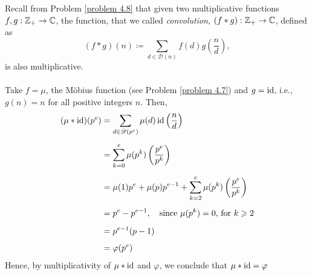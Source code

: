 \vspace*{1em}

Recall from Problem \ref{problem 4.8} that given two multiplicative functions $f,g:\mathbb Z_+ \to \mathbb C$, the function, that we called \emph{convolution}, $(f*g):\mathbb Z_+ \to \mathbb C$, defined as
\[(f*g)(n) \coloneqq \sum_{d \in \mathscr{D}(n)}f(d)g\left(\frac{n}{d}\right),\]
is also multiplicative.\\
\\
Take $f = \mu$, the M{\"o}bius function (see Problem \ref{problem 4.7}) and $g = \operatorname{id}$, i.e., $g(n) = n$ for all positive integers $n$. Then, 
\begin{align*}
(\mu * \operatorname{id})(p^e) &= \sum_{d \in \mathscr{D}(p^e)}\mu(d)\operatorname{id}\left(\frac{n}{d}\right)\\[0.5em]
&= \sum_{k =0}^e \mu(p^k)\left(\frac{p^e}{p^k}\right)\\[0.5em]
&= \mu(1)p^e + \mu(p)p^{e-1} + \sum_{k =2}^e \mu(p^k)\left(\frac{p^e}{p^k}\right)\\[0.5em]
&= p^e - p^{e-1},\quad\text{since $\mu(p^k) = 0$, for $k\geqslant 2$}\\[0.5em]
&= p^{e-1}(p - 1)\\[0.5em]
&= \varphi(p^e)
\end{align*}
Hence, by multiplicativity of $\mu * \operatorname{id}$ and $\varphi$, we conclude that $\mu*\operatorname{id} = \varphi$

\vspace*{1em}

